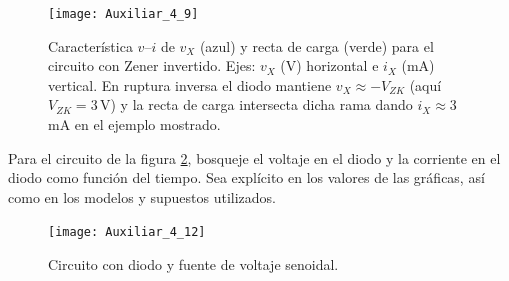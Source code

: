 \documentclass[
  11pt,
  letterpaper,
   addpoints,
   answers
  ]{exam}
\begin{document}
\begin{questions}
\begin{solution}
\begin{figure}[H]
  \centering
  \texttt{[image: Auxiliar\_4\_9]}
  \caption{Característica $v$--$i$ de $v_X$ (azul) y recta de carga (verde) para el circuito con Zener invertido. Ejes: $v_X$ (V) horizontal e $i_X$ (mA) vertical. En ruptura inversa el diodo mantiene $v_X\approx -V_{ZK}$ (aquí $V_{ZK}=3\,$V) y la recta de carga intersecta dicha rama dando $i_X\approx3\,$mA en el ejemplo mostrado.}
  \label{fig:iv-diodo}
\end{figure}
\end{solution}


\question Para el circuito de la figura \ref{fig:3}, bosqueje el voltaje en el diodo y la corriente en el diodo como función del tiempo. Sea explícito en los valores de las gráficas, así como en los modelos y supuestos utilizados.
\begin{figure}[H]
  \centering
\texttt{[image: Auxiliar\_4\_12]}
  \caption{Circuito con diodo y fuente de voltaje senoidal.}
  \label{fig:3}
\end{figure}


\end{questions}
\end{document}
